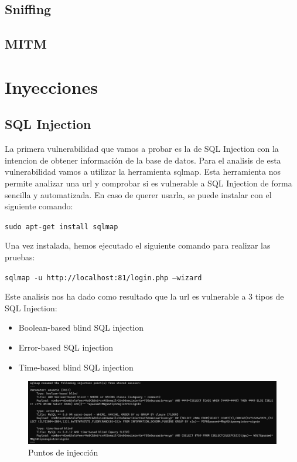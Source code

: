 \documentclass{report}
\begin{document}
            \subsection{Sniffing}
            \clearpage
            \subsection{MITM}
            \clearpage
        \section{Inyecciones}
            \subsection{SQL Injection}
                La primera vulnerabilidad que vamos a probar es la de SQL Injection con la intencion de obtener información de la base de datos.
                Para el analisis de esta vulnerabilidad vamos a utilizar la herramienta sqlmap. 
                Esta herramienta nos permite analizar una url y comprobar si es vulnerable a SQL Injection de forma sencilla y automatizada.
                En caso de querer usarla, se puede instalar con el siguiente comando:
                \begin{center}
                    \texttt{sudo apt-get install sqlmap}
                \end{center}
                Una vez instalada, hemos ejecutado el siguiente comando para realizar las pruebas:\\
                \begin{center}
                    \texttt{sqlmap -u http://localhost:81/login.php --wizard}
                \end{center}
                Este analisis nos ha dado como resultado que la url es vulnerable a 3 tipos de SQL Injection:
                \begin{itemize}
                    \item Boolean-based blind SQL injection
                    \item Error-based SQL injection
                    \item Time-based blind SQL injection
                \end{itemize}
                \begin{figure}[H]
                    \centering
                    \includegraphics[width=1\textwidth]{./img/vulnerabilidades/2.3/1.1.png}
                    \caption{Puntos de injección}
                \end{figure}
\end{document}
